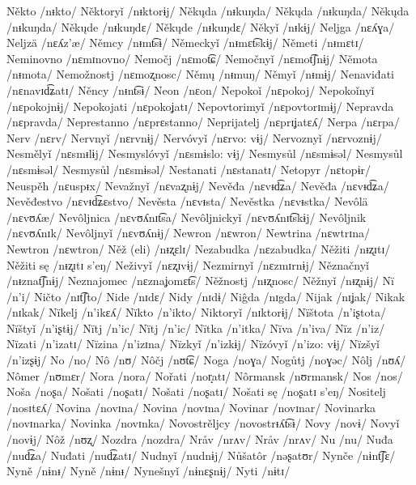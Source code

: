 Někto /nᵻkto/
Něktoryǐ /nᵻktorɨj/
Někųda /nᵻkuŋda/
Někųda /nᵻkuŋda/
Někųda /nᵻkuŋda/
Někųde /nᵻkuŋdɛ/
Někųde /nᵻkuŋdɛ/
Někyǐ /nᵻkɨj/
Neljga /nɛʎɣa/
Neljzä /nɛʎz’æ/
Němcy /nᵻmt͡sɨ/
Německyǐ /nᵻmɛt͡skɨj/
Němeti /nᵻmɛtɪ/
Neminovno /nɛmɪnovno/
Nemočj /nɛmot͡ɕ/
Nemočnyǐ /nɛmot͡ʃnɨj/
Němota /nᵻmota/
Nemožnostj /nɛmoʐnosc/
Němų /nᵻmuŋ/
Němyǐ /nᵻmɨj/
Nenaviđati /nɛnavɪd͡ʑatɪ/
Něncy /nᵻnt͡sɨ/
Neon /nɛon/
Nepokoǐ /nɛpokoj/
Nepokoǐnyǐ /nɛpokojnɨj/
Nepokojati /nɛpokoʝatɪ/
Nepovtorimyǐ /nɛpovtorɪmɨj/
Nepravda /nɛpravda/
Neprestanno /nɛprɛstanno/
Neprijatelj /nɛprɪʝatɛʎ/
Nerpa /nɛrpa/
Nerv /nɛrv/
Nervnyǐ /nɛrvnɨj/
Nervóvyǐ /nɛrvo: vɨj/
Nervoznyǐ /nɛrvoznɨj/
Nesmělyǐ /nɛsmᵻlɨj/
Nesmyslóvyǐ /nɛsmɨslo: vɨj/
Nesmysůl /nɛsmɨsəl/
Nesmysůl /nɛsmɨsəl/
Nesmysůl /nɛsmɨsəl/
Nestanati /nɛstanatɪ/
Netopyr /nɛtopɨr/
Neuspěh /nɛuspᵻx/
Nevažnyǐ /nɛvaʐnɨj/
Nevěđa /nɛvᵻd͡ʑa/
Nevěđa /nɛvᵻd͡ʑa/
Nevěđestvo /nɛvᵻd͡ʑɛstvo/
Nevěsta /nɛvᵻsta/
Nevěstka /nɛvᵻstka/
Nevôlä /nɛvʊʎæ/
Nevôljnica /nɛvʊʎnɪt͡sa/
Nevôljnickyǐ /nɛvʊʎnɪt͡skɨj/
Nevôljnik /nɛvʊʎnɪk/
Nevôljnyǐ /nɛvʊʎnɨj/
Newron /nɛwron/
Newtrina /nɛwtrɪna/
Newtron /nɛwtron/
Něž (eli) /nᵻʐɛlɪ/
Nezabudka /nɛzabudka/
Něžiti /nᵻʐɪtɪ/
Něžiti sę /nᵻʐɪtɪ s’eŋ/
Neživyǐ /nɛʐɪvɨj/
Nezmirnyǐ /nɛzmɪrnɨj/
Něznačnyǐ /nᵻznat͡ʃnɨj/
Neznajomec /nɛznaʝomɛt͡s/
Něžnostj /nᵻʐnosc/
Něžnyǐ /nᵻʐnɨj/
Nï /n’i/
Ničto /nɪt͡ʃto/
Nide /nɪdɛ/
Nidy /nɪdɨ/
Niĝda /nɪgda/
Nijak /nɪʝak/
Nikak /nɪkak/
Nïkelj /n’ikɛʎ/
Nïkto /n’ikto/
Niktoryǐ /nɪktorɨj/
Nïštota /n’iʂtota/
Nïštyǐ /n’iʂtɨj/
Nïtj /n’ic/
Nïtj /n’ic/
Nïtka /n’itka/
Nïva /n’iva/
Nïz /n’iz/
Nïzati /n’izatɪ/
Nïzina /n’izɪna/
Nïzkyǐ /n’izkɨj/
Nïzóvyǐ /n’izo: vɨj/
Nïzšyǐ /n’izʂɨj/
No /no/
Nô /nʊ/
Nôčj /nʊt͡ɕ/
Noga /noɣa/
Nogůtj /noɣəc/
Nôlj /nʊʎ/
Nômer /nʊmɛr/
Nora /nora/
Nořati /nor̝atɪ/
Nôrmansk /nʊrmansk/
Nos /nos/
Noša /noʂa/
Nošati /noʂatɪ/
Nošati /noʂatɪ/
Nošati sę /noʂatɪ s’eŋ/
Nositelj /nosɪtɛʎ/
Novina /novɪna/
Novina /novɪna/
Novinar /novɪnar/
Novinarka /novɪnarka/
Novinka /novɪnka/
Novostrěljcy /novostrᵻʎt͡sɨ/
Novy /novɨ/
Novyǐ /novɨj/
Nôž /nʊʐ/
Nozdra /nozdra/
Nråv /nrʌv/
Nråv /nrʌv/
Nu /nu/
Nuđa /nud͡ʑa/
Nuđati /nud͡ʑatɪ/
Nudnyǐ /nudnɨj/
Nůšatôr /nəʂatʊr/
Nynče /nɨnt͡ʃɛ/
Nyně /nɨnᵻ/
Nyně /nɨnᵻ/
Nynešnyǐ /nɨnɛʂnɨj/
Nyti /nɨtɪ/